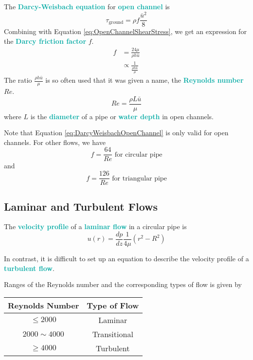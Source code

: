 \documentclass[twoside]{article}
\newcommand{\highlightbluetext}[1]{\textcolor[HTML]{09ACA6}{\textbf{#1}}}
\numberwithin{equation}{section}
\begin{document}
	The \highlightbluetext{Darcy-Weisbach equation} for \highlightbluetext{open channel} is
	\begin{equation}
		\tau_{\text{ground}} = \rho f \frac{\bar{u}^2}{8}
		\label{eq:DarcyWeisbachOpenChannel}
	\end{equation}
	Combining with Equation \ref{eq:OpenChannelShearStress}, we get an expression for the \highlightbluetext{Darcy friction factor} $f$.
	\begin{align*}
		f &= \frac{24\mu}{\rho h \bar{u}} \\
		  &\propto \frac{1}{\frac{\rho h \bar{u}}{\mu}}
	\end{align*}
	The ratio $\frac{\rho h \bar{u}}{\mu}$ is so often used that it was given a name, the \highlightbluetext{Reynolds number} $Re$.
	\begin{equation}
		Re = \frac{\rho L \bar{u}}{\mu}
		\label{eq:ReynoldsNumber}
	\end{equation}
	where $L$ is the \highlightbluetext{diameter} of a pipe or \highlightbluetext{water depth} in open channels.
	
	Note that Equation \ref{eq:DarcyWeisbachOpenChannel} is only valid for open channels. For other flows, we have
	\begin{equation*}
		f = \frac{64}{Re} \text{ for circular pipe}
	\end{equation*}
	and
	\begin{equation*}
		f = \frac{126}{Re} \text{ for triangular pipe}
	\end{equation*}
	
	\subsection{Laminar and Turbulent Flows}
	\label{subsec:LaminarAndTurbulentFlows}
	
	The \highlightbluetext{velocity profile} of a \highlightbluetext{laminar flow} in a circular pipe is
	\begin{equation}
		u(r) = \frac{dp}{dz} \frac{1}{4\mu} \left( r^2-R^2 \right)
		\label{eq:VelocityProfileLaminarFlowCircularPipe}
	\end{equation}
	
	In contrast, it is difficult to set up an equation to describe the velocity profile of a \highlightbluetext{turbulent flow}.
	
	Ranges of the Reynolds number and the corresponding types of flow is given by
	\begin{table}[h]
		\centering
		\begin{tabular}{cc}
			\textbf{Reynolds Number} & \textbf{Type of Flow} \\
			\hline
			$\leq 2000$ & Laminar \\
			$2000 \sim 4000$ & Transitional \\
			$\geq 4000$ & Turbulent \\
		\end{tabular}
	\end{table}
	
\end{document}
